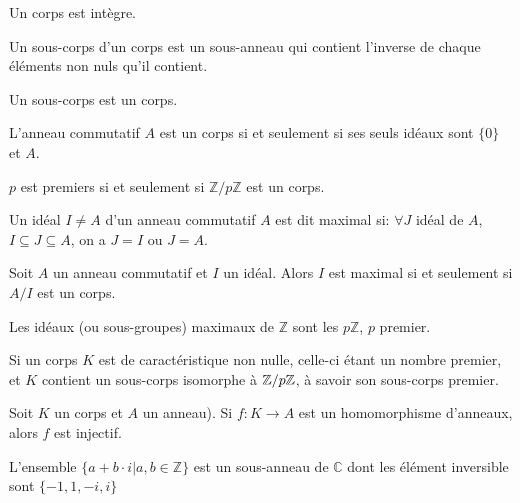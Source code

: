 \documentclass[12pt,a4paper]{article}
\begin{document}
\begin{flushleft}
\begin{prop}
Un corps est intègre.
\end{prop}

\begin{mydef}
Un sous-corps d'un corps est un sous-anneau qui contient l'inverse de chaque éléments non nuls qu'il contient.
\end{mydef}

\begin{rem}
Un sous-corps est un corps.
\end{rem}

\begin{prop}
L'anneau commutatif $A$ est un corps si et seulement si ses seuls idéaux sont $\{ 0 \}$ et $A$.
\end{prop}

\begin{prop}
$p$ est premiers si et seulement si $\mathbb{Z}/ p \mathbb{Z}$ est un corps.
\end{prop}

\begin{mydef}
Un idéal $I \neq A$ d'un anneau commutatif $A$ est dit maximal si:
$\forall J$ idéal de $A$, $I \subseteq J \subseteq A$, on a $J = I$ ou $J = A$.
\end{mydef}

\begin{prop}
Soit $A$ un anneau commutatif et $I$ un idéal. Alors $I$ est maximal si et seulement si $A/I$ est un corps.
\end{prop}

\begin{cor}
Les idéaux (ou sous-groupes) maximaux de $\mathbb{Z}$ sont les $p \mathbb{Z}$, $p$ premier.
\end{cor}

\begin{prop}
Si un corps $K$ est de caractéristique non nulle, celle-ci étant un nombre premier, et $K$ contient un sous-corps isomorphe à $\mathbb{Z} / p \mathbb{Z}$, à savoir son sous-corps premier.
\end{prop}

\begin{prop}
Soit $K$ un corps et $A$ un anneau). Si $f: K \rightarrow A$ est un homomorphisme d'anneaux, alors $f$ est injectif.
\end{prop}

\begin{prop}
L'ensemble $\{ a + b \cdot i| a, b \in \mathbb{Z} \} $ est un sous-anneau de $\mathbb{C}$ dont les élément inversible sont $\{-1, 1, -i, i \}$
\end{prop}


\end{flushleft}
\end{document}

